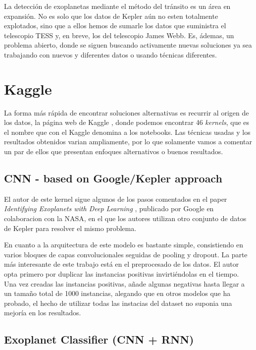 
La detección de exoplanetas mediante el método del tránsito es un área en expansión. No es solo que los datos de Kepler aún no esten totalmente explotados, sino que a ellos hemos de sumarle los datos que suministra el telescopio TESS y, en breve, los del telescopio James Webb. Es, ádemas, un problema abierto, donde se siguen buscando activamente nuevas soluciones ya sea trabajando con nuevos y diferentes datos o usando técnicas diferentes.

\section{Kaggle}

La forma más rápida de encontrar soluciones alternativas es recurrir al origen de los datos, la página web de Kaggle \cite{Kaggle-exoplanet}, donde podemos encontrar 46 \textit{kernels}, que es el nombre que con el Kaggle denomina a los notebooks. Las técnicas usadas y los resultados obtenidos varian ampliamente, por lo que solamente vamos a comentar un par de ellos que presentan enfoques alternativos o buenos resultados.

\subsection{CNN - based on Google/Kepler approach \cite{Kaggle-kernel-CNN-Google}} 

El autor de este kernel sigue algunos de los pasos comentados en el paper \textit{Identifying Exoplanets with Deep Learning} \cite{2018AJ....155...94S}, publicado por Google en colaboracion con la NASA, en el que los autores utilizan otro conjunto de datos de Kepler para resolver el mismo problema.

En cuanto a la arquitectura de este modelo es bastante simple, consistiendo en varios bloques de capas convolucionales seguidas de pooling y dropout. La parte más interesante de este trabajo está en el preprocesado de los datos. El autor opta primero por duplicar las instancias positivas invirtiéndolas en el tiempo. Una vez creadas las instancias positivas, añade algunas negativas hasta llegar a un tamaño total de 1000 instancias, alegando que en otros modelos que ha probado, el hecho de utilizar todas las instacias del dataset no suponia una mejoría en los resultados.   

\subsection{Exoplanet Classifier (CNN + RNN) \cite{Kaggle-kernel-Exoplanet-Classifier}}

